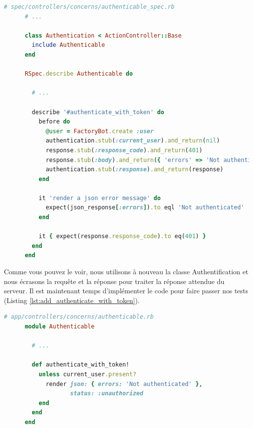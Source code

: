\documentclass[]{report}
\begin{document}
    \begin{scriptsize}
      \begin{lstlisting}[language=ruby, label={lst:add_authenticate_with_token_test}, caption={Test de l'authentification par la méthode de jeton}]
      # spec/controllers/concerns/authenticable_spec.rb
      # ...

      class Authentication < ActionController::Base
        include Authenticable
      end

      RSpec.describe Authenticable do

        # ...

        describe '#authenticate_with_token' do
          before do
            @user = FactoryBot.create :user
            authentication.stub(:current_user).and_return(nil)
            response.stub(:response_code).and_return(401)
            response.stub(:body).and_return({ 'errors' => 'Not authenticated' }.to_json)
            authentication.stub(:response).and_return(response)
          end

          it 'render a json error message' do
            expect(json_response[:errors]).to eql 'Not authenticated'
          end

          it { expect(response.response_code).to eq(401) }
        end
      end
      \end{lstlisting}
    \end{scriptsize}


    Comme vous pouvez le voir, nous utilisons à nouveau la classe Authentification et nous écrasons la requête et la réponse pour traiter la réponse attendue du serveur. Il est maintenant temps d'implémenter le code pour faire passer nos tests (Listing \ref{lst:add_authenticate_with_token}).

    \begin{scriptsize}
      \begin{lstlisting}[language=ruby, label={lst:add_authenticate_with_token}, caption={Ajout de l'authentification par la méthode de jeton}]
      # app/controllers/concerns/authenticable.rb
      module Authenticable

        # ...

        def authenticate_with_token!
          unless current_user.present?
            render json: { errors: 'Not authenticated' },
                   status: :unauthorized
          end
        end
      end
      \end{lstlisting}
    \end{scriptsize}
\end{document}
